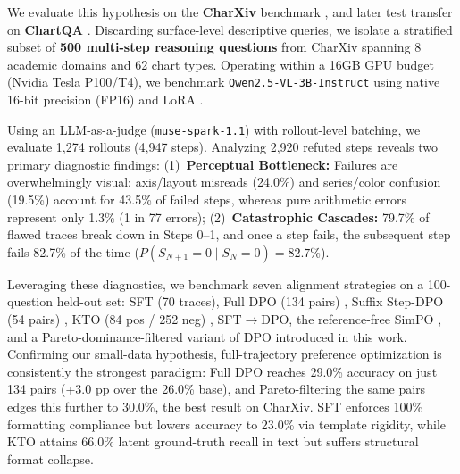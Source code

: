 \documentclass[11pt]{article}
\begin{document}
We evaluate this hypothesis on the \textbf{CharXiv} benchmark \citep{wang2024charxiv}, and later test transfer on \textbf{ChartQA} \citep{masry2022chartqa}. Discarding surface-level descriptive queries, we isolate a stratified subset of \textbf{500 multi-step reasoning questions} from CharXiv spanning 8 academic domains and 62 chart types. Operating within a 16GB GPU budget (Nvidia Tesla P100/T4), we benchmark \texttt{Qwen2.5-VL-3B-Instruct} \citep{bai2025qwen25vl} using native 16-bit precision (FP16) and LoRA \citep{hu2021lora}.

Using an LLM-as-a-judge (\texttt{muse-spark-1.1}) \citep{meta2026musespark, zheng2023judging} with rollout-level batching, we evaluate 1,274 rollouts (4,947 steps). Analyzing 2,920 refuted steps reveals two primary diagnostic findings: (1)~\textbf{Perceptual Bottleneck:} Failures are overwhelmingly visual: axis/layout misreads (24.0\%) and series/color confusion (19.5\%) account for 43.5\% of failed steps, whereas pure arithmetic errors represent only 1.3\% (1 in 77 errors); (2)~\textbf{Catastrophic Cascades:} 79.7\% of flawed traces break down in Steps 0--1, and once a step fails, the subsequent step fails 82.7\% of the time ($P(S_{N+1}=0 \mid S_N=0) = 82.7\%$).

Leveraging these diagnostics, we benchmark seven alignment strategies on a 100-question held-out set: SFT (70 traces), Full DPO (134 pairs) \citep{rafailov2023dpo}, Suffix Step-DPO (54 pairs) \citep{lai2024stepdpo}, KTO (84 pos / 252 neg) \citep{ethayarajh2024kto}, SFT$\rightarrow$DPO, the reference-free SimPO \citep{meng2024simpo}, and a Pareto-dominance-filtered variant of DPO introduced in this work. Confirming our small-data hypothesis, full-trajectory preference optimization is consistently the strongest paradigm: Full DPO reaches 29.0\% accuracy on just 134 pairs (+3.0 pp over the 26.0\% base), and Pareto-filtering the same pairs edges this further to 30.0\%, the best result on CharXiv. SFT enforces 100\% formatting compliance but lowers accuracy to 23.0\% via template rigidity, while KTO attains 66.0\% latent ground-truth recall in text but suffers structural format collapse.
\end{document}
